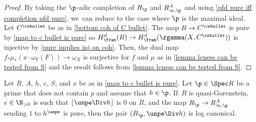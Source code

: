 \begin{proof}
By taking the $\p$-adic completion of $R_\p$ and $R^A_{\infty,\p}$ and using \autoref{pfd pure iff completion pfd pure}, we~can reduce to the case where $\p$ is the maximal ideal.
Let $C^\csbullet$ be as in \autoref{bottom coh of C bullet}.
The map $R\to C^\csbullet$ is pure by \autoref{map to c bullet is pure} so $H_\fram^d(R)\to H_\fram^d(\rgamma(X,C^\csbullet))$ is injective by \autoref{pure implies inj on coh}.
Then,
the dual map $f_* \mu_*(x\cdot \omega_Y(F))\to \omega_X$ is surjective for $f$ and $\mu$ as in \autoref{lemma lcness can be tested from S} and the result follows from \autoref{lemma lcness can be tested from S}.
\end{proof}

\begin{proposition}\label{lc implies log canonical}
Let $R$, $A$, $h$, $e$, $S$, and $x$ be as in \autoref{map to c bullet is pure}. Let $\p\in \Spec R$ be a prime that does not contain $p$ and assume that $h\in \p$. If~$R$ is quasi-Gorenstein, $e\in \N_{>0}$ is such that $\lfloor \unpe\Div h \rfloor$ is $0$ on $R$, and
the map $R_\p\to R^A_{\infty,\p}$ sending $1$ to $h^\unpe$ is pure, then the pair $(R_\p,\unpe \Div h)$ is log canonical.
\end{proposition}

